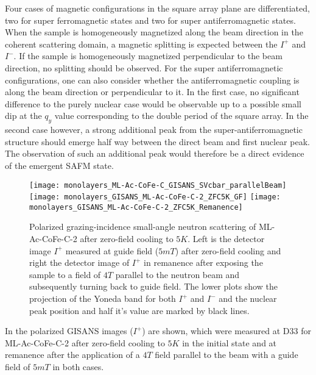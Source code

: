\documentclass[\main/dresen_thesis.tex]{subfiles}
\begin{document}
  Four cases of magnetic configurations in the square array plane are differentiated, two for super ferromagnetic states and two for super antiferromagnetic states.
  When the sample is homogeneously magnetized along the beam direction in the coherent scattering domain, a magnetic splitting is expected between the $I^{+}$ and $I^{-}$.
  If the sample is homogeneously magnetized perpendicular to the beam direction, no splitting should be observed.
  For the super antiferromagnetic configurations, one can also consider whether the antiferromagnetic coupling is along the beam direction or perpendicular to it.
  In the first case, no significant difference to the purely nuclear case would be observable up to a possible small dip at the $q_y$ value corresponding to the double period of the square array.
  In the second case however, a strong additional peak from the super-antiferromagnetic structure should emerge half way between the direct beam and first nuclear peak.
  The observation of such an additional peak would therefore be a direct evidence of the emergent SAFM state.
  \\

  \begin{figure}[tb]
    \centering
    \texttt{[image: monolayers\_ML-Ac-CoFe-C\_GISANS\_SVcbar\_parallelBeam]}
    \texttt{[image: monolayers\_GISANS\_ML-Ac-CoFe-C-2\_ZFC5K\_GF]}
    \texttt{[image: monolayers\_GISANS\_ML-Ac-CoFe-C-2\_ZFC5K\_Remanence]}
    \caption{\label{fig:monolayer:magneticStructure:polGisans5KZFC}Polarized grazing-incidence small-angle neutron scattering of ML-Ac-CoFe-C-2 after zero-field cooling to $5 \unit{K}$. Left is the detector image $I^{+}$ measured at guide field ($5 \unit{mT}$) after zero-field cooling and right the detector image of $I^{+}$ in remanence after exposing the sample to a field of $4 \unit{T}$ parallel to the neutron beam and subsequently turning back to guide field. The lower plots show the projection of the Yoneda band for both $I^{+}$ and $I^{-}$ and the nuclear peak position and half it's value are marked by black lines.}
  \end{figure}

  In  the polarized GISANS images ($I^{+}$) are shown, which were measured at D33 for ML-Ac-CoFe-C-2 after zero-field cooling to $5 \unit{K}$ in the initial state and at remanence after the application of a $4 \unit{T}$ field parallel to the beam with a guide field of $5 \unit{mT}$ in both cases.
\end{document}

